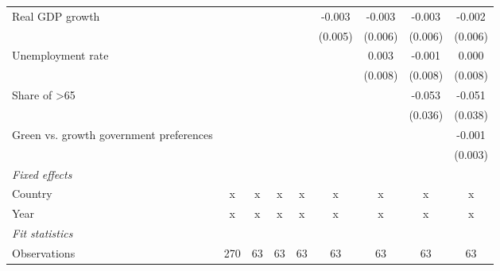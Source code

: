 \begin{table}[htbp]
\begin{tabular}{lcccccccc}
      Real GDP growth                                                         &         &         &               &                & -0.003         & -0.003         & -0.003         & -0.002\\   
                                                                              &         &         &               &                & (0.005)        & (0.006)        & (0.006)        & (0.006)\\   
      Unemployment rate                                                       &         &         &               &                &                & 0.003          & -0.001         & 0.000\\   
                                                                              &         &         &               &                &                & (0.008)        & (0.008)        & (0.008)\\   
      Share of >65                                                            &         &         &               &                &                &                & -0.053         & -0.051\\   
                                                                              &         &         &               &                &                &                & (0.036)        & (0.038)\\   
      Green vs. growth government preferences                                 &         &         &               &                &                &                &                & -0.001\\   
                                                                              &         &         &               &                &                &                &                & (0.003)\\   
      \emph{Fixed effects}\\
      Country                                                                 & x       & x       & x             & x              & x              & x              & x              & x\\  
      Year                                                                    & x       & x       & x             & x              & x              & x              & x              & x\\  
      \midrule \emph{Fit statistics}\\
      Observations                                                            & 270     & 63      & 63            & 63             & 63             & 63             & 63             & 63\\  

\end{tabular}
\end{table}

